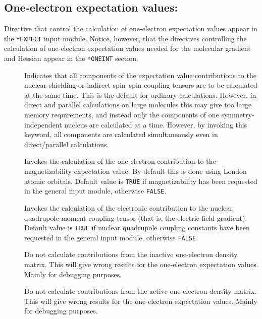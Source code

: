 \subsection{One-electron expectation values:
}\label{sec:expect}

Directive that control the calculation of one-electron expectation
values appear in the \verb|*EXPECT| input module. Notice, however,
that the directives controlling the calculation of one-electron
expectation values needed for the molecular gradient and Hessian
appear in the \verb|*ONEINT| section.

\begin{description}
\item[] Indicates that all components of the expectation
  value contributions to the nuclear
shielding or indirect spin--spin
  coupling
  tensors are to be calculated at the
same time. This is the
default for ordinary calculations. However, in direct and parallel
calculations on large molecules this may give too large memory
requirements, and instead only the components of one symmetry-independent
nucleus are calculated at a time. However, by invoking
this keyword, all components are calculated simultaneously even in
direct/parallel calculations.

\item[] Invokes the calculation of the one-electron
contribution to the magnetizability expectation
value. By default this
is done using London atomic orbitals. Default
value is \verb|TRUE| if
magnetizability has been requested in the general input module,
otherwise \verb|FALSE|.

\item[] Invokes the calculation of the electronic
contribution to the nuclear quadrupole moment coupling
tensor (that
is, the electric field
gradient). Default value is \verb|TRUE| if
nuclear quadrupole coupling constants have been requested in the
general input module, otherwise \verb|FALSE|.

\item[] Do not calculate contributions from the inactive
one-electron density matrix. This will give wrong results for the
one-electron expectation values. Mainly for debugging purposes.

\item[] Do not calculate contributions from the active
one-electron density matrix. This will give wrong results for the
one-electron expectation values. Mainly for debugging purposes.


\end{description}
